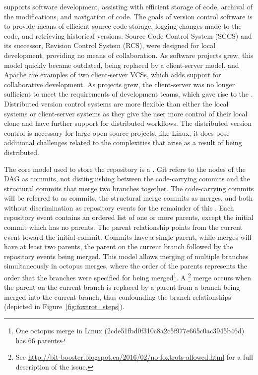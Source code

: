  supports software development,
assisting with efficient storage of code, archival of the modifications,
and navigation of code. The goals of version control software is to
provide means of efficient source code storage, logging changes made to
the code, and retrieving historical versions. Source Code Control System
(SCCS) and its successor, Revision Control System (RCS), were designed
for local development, providing no means of collaboration. As software
projects grew, this model quickly became outdated, being replaced by a
client-server model.  and Apache
 are examples of two client-server VCSs, which
adds support for collaborative development. As projects grew, the
client-server was no longer sufficient to meet the requirements of
development teams, which gave rise to the . Distributed version control systems are more
flexible than either the local systems or client-server systems as they
give the user more control of their local clone and have further support
for distributed workflows. The distributed version control is necessary
for large open source projects, like Linux, it does pose additional
challenges related to the complexities that arise as a result of being
distributed.


The core model used to store the repository is a . Git refers to the nodes of the DAG as commits,
not distinguishing between the code-carrying commits and the structural
commits that merge two branches together. The code-carrying commits will
be referred to as commits, the structural merge commits as merges, and
both without discrimination as repository events for the remainder of
this \paper{}. Each repository event contains an ordered list of one
or more parents, except the initial commit which has no parents. The
parent relationship points from the current event toward the initial
commit. Commits have a single parent, while merges will have at least
two parents, the parent on the current branch followed by the repository
events being merged. This model allows merging of multiple branches
simultaneously in octopus merges, where the order of the parents
represents the order that the branches were specified for being
merged\footnote{One octopus merge in Linux
  (2cde51fbd0f310c8a2c5f977e665c0ac3945b46d) has 66 parents}.
A \foxtrot\footnote{See
  \url{http://bit-booster.blogspot.ca/2016/02/no-foxtrots-allowed.html}
  for a full description of the issue.} merge occurs when the parent on
the current branch is replaced by a parent from a branch being merged
into the current branch, thus confounding the branch relationships
(depicted in Figure~\ref{fig:foxtrot_steps}).

